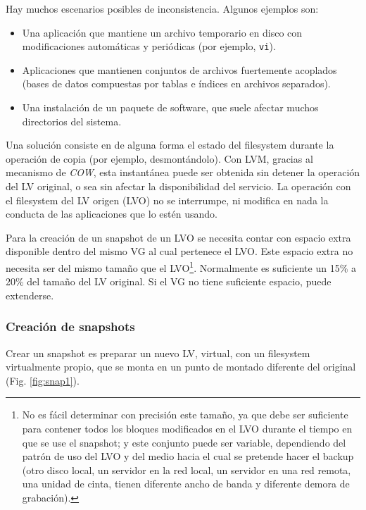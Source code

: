 Hay muchos escenarios posibles de inconsistencia. Algunos ejemplos son:
\begin{itemize}
	\item Una aplicación que mantiene un archivo temporario en disco con modificaciones automáticas y periódicas (por ejemplo, \lstinline$vi$). 
	\item Aplicaciones que mantienen conjuntos de archivos fuertemente acoplados (bases de datos compuestas por tablas e índices en archivos separados).
	\item Una instalación de un paquete de software, que suele afectar muchos directorios del sistema. 

\end{itemize}

Una solución consiste en  de alguna forma el estado del filesystem durante la operación de copia (por ejemplo, desmontándolo). Con LVM, gracias al mecanismo de \emph{COW}, esta instantánea puede ser obtenida sin detener la operación del LV original, o sea sin afectar la disponibilidad del servicio. La operación con el filesystem del LV origen (LVO) no se interrumpe, ni modifica en nada la conducta de las aplicaciones que lo estén usando. 

Para la creación de un snapshot de un LVO se necesita contar con espacio extra disponible dentro del mismo VG al cual pertenece el LVO. Este espacio extra no necesita ser del mismo tamaño que el LVO\footnote{No es fácil determinar con precisión este tamaño, ya que debe ser suficiente para contener todos los bloques modificados en el LVO durante el tiempo en que se use el snapshot; y este conjunto puede ser variable, dependiendo del patrón de uso del LVO y del medio hacia el cual se pretende hacer el backup (otro disco local, un servidor en la red local, un servidor en una red remota, una unidad de cinta, tienen diferente ancho de banda y diferente demora de grabación).}. Normalmente es suficiente un 15\% a 20\% del tamaño del LV original. Si el VG no tiene suficiente espacio, puede extenderse.

\subsubsection{Creación de snapshots}
\label{ssub:snapcreate}

Crear un snapshot es preparar un nuevo LV, virtual, con un filesystem virtualmente propio, que se monta en un punto de montado diferente del original (Fig. \ref{fig:snap1}). 

